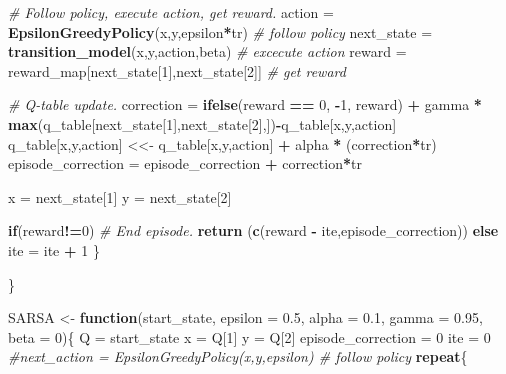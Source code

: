 \documentclass[
]{article}
\newenvironment{Shaded}{\begin{snugshade}}{\end{snugshade}}
\newcommand{\AttributeTok}[1]{\textcolor[rgb]{0.13,0.29,0.53}{#1}}
\newcommand{\CommentTok}[1]{\textcolor[rgb]{0.56,0.35,0.01}{\textit{#1}}}
\newcommand{\ControlFlowTok}[1]{\textcolor[rgb]{0.13,0.29,0.53}{\textbf{#1}}}
\newcommand{\DecValTok}[1]{\textcolor[rgb]{0.00,0.00,0.81}{#1}}
\newcommand{\FloatTok}[1]{\textcolor[rgb]{0.00,0.00,0.81}{#1}}
\newcommand{\FunctionTok}[1]{\textcolor[rgb]{0.13,0.29,0.53}{\textbf{#1}}}
\newcommand{\NormalTok}[1]{#1}
\newcommand{\OtherTok}[1]{\textcolor[rgb]{0.56,0.35,0.01}{#1}}
\newcommand{\SpecialCharTok}[1]{\textcolor[rgb]{0.81,0.36,0.00}{\textbf{#1}}}
\begin{document}
\begin{Shaded}
\begin{Highlighting}[]
    \CommentTok{\# Follow policy, execute action, get reward.}
\NormalTok{    action }\OtherTok{=} \FunctionTok{EpsilonGreedyPolicy}\NormalTok{(x,y,epsilon}\SpecialCharTok{*}\NormalTok{tr) }\CommentTok{\# follow policy}
\NormalTok{    next\_state }\OtherTok{=} \FunctionTok{transition\_model}\NormalTok{(x,y,action,beta) }\CommentTok{\# excecute action}
\NormalTok{    reward }\OtherTok{=}\NormalTok{ reward\_map[next\_state[}\DecValTok{1}\NormalTok{],next\_state[}\DecValTok{2}\NormalTok{]] }\CommentTok{\# get reward}
    
    \CommentTok{\# Q{-}table update.}
\NormalTok{    correction }\OtherTok{=} \FunctionTok{ifelse}\NormalTok{(reward }\SpecialCharTok{==} \DecValTok{0}\NormalTok{, }\SpecialCharTok{{-}}\DecValTok{1}\NormalTok{, reward) }\SpecialCharTok{+}\NormalTok{ gamma }\SpecialCharTok{*} \FunctionTok{max}\NormalTok{(q\_table[next\_state[}\DecValTok{1}\NormalTok{],next\_state[}\DecValTok{2}\NormalTok{],])}\SpecialCharTok{{-}}\NormalTok{q\_table[x,y,action]}
\NormalTok{    q\_table[x,y,action] }\OtherTok{\textless{}\textless{}{-}}\NormalTok{ q\_table[x,y,action] }\SpecialCharTok{+}\NormalTok{ alpha }\SpecialCharTok{*}\NormalTok{ (correction}\SpecialCharTok{*}\NormalTok{tr)}
\NormalTok{    episode\_correction }\OtherTok{=}\NormalTok{ episode\_correction }\SpecialCharTok{+}\NormalTok{ correction}\SpecialCharTok{*}\NormalTok{tr}
    
\NormalTok{    x }\OtherTok{=}\NormalTok{ next\_state[}\DecValTok{1}\NormalTok{]}
\NormalTok{    y }\OtherTok{=}\NormalTok{ next\_state[}\DecValTok{2}\NormalTok{]}
    
    \ControlFlowTok{if}\NormalTok{(reward}\SpecialCharTok{!=}\DecValTok{0}\NormalTok{)}
      \CommentTok{\# End episode.}
      \FunctionTok{return}\NormalTok{ (}\FunctionTok{c}\NormalTok{(reward }\SpecialCharTok{{-}}\NormalTok{ ite,episode\_correction))}
    \ControlFlowTok{else}
\NormalTok{      ite }\OtherTok{=}\NormalTok{ ite }\SpecialCharTok{+} \DecValTok{1}
\NormalTok{  \}}
  
\NormalTok{\}}

\NormalTok{SARSA }\OtherTok{\textless{}{-}} \ControlFlowTok{function}\NormalTok{(start\_state, }\AttributeTok{epsilon =} \FloatTok{0.5}\NormalTok{, }\AttributeTok{alpha =} \FloatTok{0.1}\NormalTok{, }\AttributeTok{gamma =} \FloatTok{0.95}\NormalTok{, }\AttributeTok{beta =} \DecValTok{0}\NormalTok{)\{}
\NormalTok{  Q }\OtherTok{=}\NormalTok{ start\_state}
\NormalTok{  x }\OtherTok{=}\NormalTok{ Q[}\DecValTok{1}\NormalTok{]}
\NormalTok{  y }\OtherTok{=}\NormalTok{ Q[}\DecValTok{2}\NormalTok{]}
\NormalTok{  episode\_correction }\OtherTok{=} \DecValTok{0}
\NormalTok{  ite }\OtherTok{=} \DecValTok{0}
  \CommentTok{\#next\_action = EpsilonGreedyPolicy(x,y,epsilon) \# follow policy}
  \ControlFlowTok{repeat}\NormalTok{\{}


\end{Highlighting}
\end{Shaded}
\end{document}
